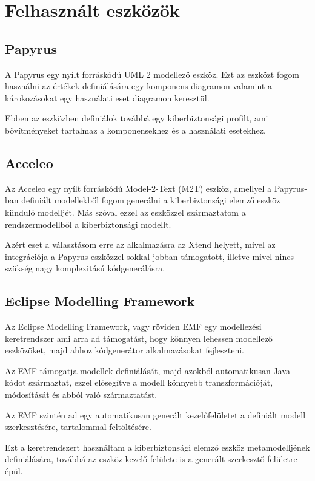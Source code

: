 \section{Felhasznált eszközök}

\subsection{Papyrus}

A Papyrus egy nyílt forráskódú UML 2 modellező eszköz. Ezt az eszközt fogom használni az értékek definiálására egy komponens diagramon valamint a károkozásokat egy használati eset diagramon keresztül.

Ebben az eszközben definiálok továbbá egy kiberbiztonsági profilt, ami bővítményeket tartalmaz a komponensekhez és a használati esetekhez.

\subsection{Acceleo}

Az Acceleo egy nyílt forráskódú Model-2-Text (M2T) eszköz, amellyel a Papyrus-ban definiált modellekből fogom generálni a kiberbiztonsági elemző eszköz kiinduló modelljét. Más szóval ezzel az eszközzel származtatom a rendszermodellből a kiberbiztonsági modellt.

Azért eset a választásom erre az alkalmazásra az Xtend helyett, mivel az integrációja a Papyrus eszközzel sokkal jobban támogatott, illetve mivel nincs szükség nagy komplexitású kódgenerálásra.

\subsection{Eclipse Modelling Framework}

Az Eclipse Modelling Framework, vagy röviden EMF egy modellezési keretrendszer ami arra ad támogatást, hogy könnyen lehessen modellező eszközöket, majd ahhoz kódgenerátor alkalmazásokat fejleszteni.

Az EMF támogatja modellek definiálását, majd azokból automatikusan Java kódot származtat, ezzel elősegítve a modell könnyebb transzformációját, módosítását és abból való származtatást.

Az EMF szintén ad egy automatikusan generált kezelőfelületet a definiált modell szerkesztésére, tartalommal feltöltésére.

Ezt a keretrendszert használtam a kiberbiztonsági elemző eszköz metamodelljének definiálására, továbbá az eszköz kezelő felülete is a generált szerkesztő felületre épül.

